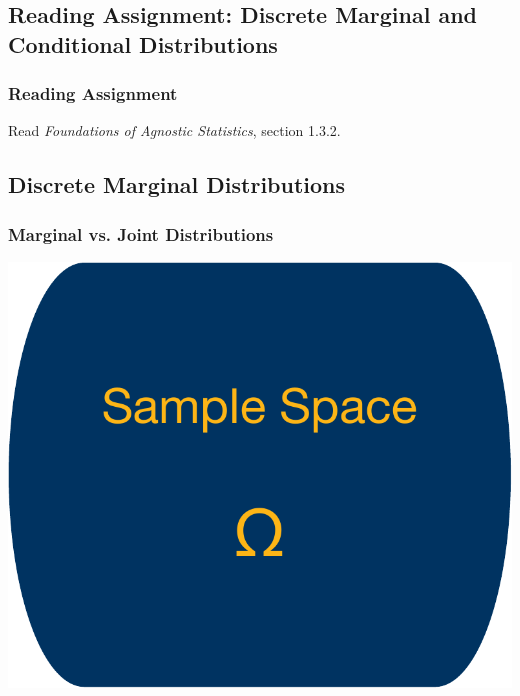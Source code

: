 \documentclass[12pt, block=fill]{beamer}
\begin{document}
\subsection{Reading Assignment: Discrete Marginal and Conditional
  Distributions}

\begin{frame}
  \frametitle{Reading Assignment}
  Read \textit{Foundations of Agnostic Statistics}, section 1.3.2.
\end{frame}

\subsection{Discrete Marginal Distributions}


\begin{frame}
  \frametitle{Marginal vs. Joint Distributions}
  \includegraphics[width= .4\textwidth ]{figures/sample_space}


\end{frame}
\end{document}
